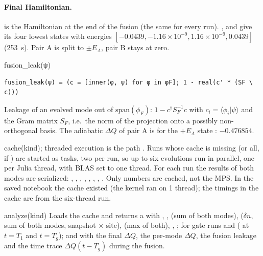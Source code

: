 \paragraph{Final Hamiltonian.}  is the Hamiltonian at the end of the fusion (the same for every run).
,  and  give its four lowest states
 with energies $[-0.0439, -1.16\times10^{-9}, 1.16\times10^{-9}, 0.0439]$ (253~s). Pair A is split to $\pm E_A$, pair B stays at zero.

\begin{function}{fusion\_leak(ψ)}
\begin{Verbatim}
fusion_leak(ψ) = (c = [inner(φ, ψ) for φ in φF]; 1 - real(c' * (SF \ c)))
\end{Verbatim}
Leakage of an evolved mode out of $\mathrm{span}(\phi_F)$: $1 - c^\dagger S_F^{-1}c$ with $c_i = \langle\phi_i|\psi\rangle$ and the Gram matrix
$S_F$, i.e.\ the norm of the projection onto a possibly non-orthogonal basis. The adiabatic $\Delta Q$ of pair A is
 for the $+E_A$ state : $-0.476854$.
\end{function}

\begin{function}{cache(kind); threaded execution}
 is the path . Runs whose cache is missing (or all, if ) are
started as  tasks, two per run, so up to six evolutions run in parallel, one per Julia thread, with
BLAS set to one thread. For each run the results of both modes are serialized: , , , , ,
, , . Only numbers are cached, not the MPS. In the saved notebook the cache
existed (the kernel ran on 1 thread); the timings in the cache are from the six-thread run.
\end{function}

\begin{function}{analyze(kind)}
Loads the cache and returns a  with , ,  (sum of both modes),  ($\delta n$, sum of both
modes, snapshot $\times$ site),  (max of both), , ; for gate runs  and 
( at $t = T_1$ and $t = T_g$); and  with the final $\Delta Q$, the per-mode $\Delta Q$, the fusion leakage and the
time trace $\Delta Q(t - T_g)$ during the fusion.
\end{function}

